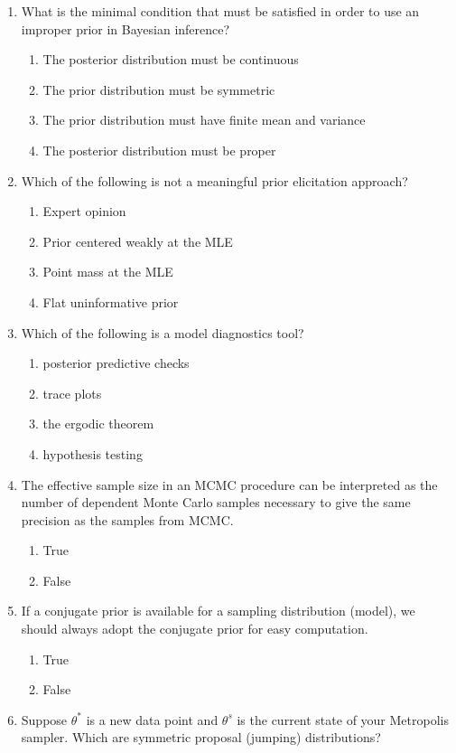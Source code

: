 \documentclass[12pt]{article}
\begin{document}
\begin{enumerate}
\item What is the minimal condition that must be satisfied in order to use an improper prior in Bayesian inference?
\begin{enumerate}
\item The posterior distribution must be continuous
\item  The prior distribution must be symmetric
\item  The prior distribution must have finite mean and variance
\item The posterior distribution must be proper
\end{enumerate}
\item Which of the following is not a meaningful prior elicitation approach?
\begin{enumerate}
\item Expert opinion
\item Prior centered weakly at the MLE
\item Point mass at the MLE
\item Flat uninformative prior
\end{enumerate}
\item Which of the following is a model diagnostics tool?
\begin{enumerate}
\item posterior predictive checks 
\item trace plots
\item the ergodic theorem
\item hypothesis testing
\end{enumerate}
\item The effective sample size in an MCMC procedure can be interpreted as the number of dependent Monte Carlo samples necessary to give the same precision as the samples from MCMC.
\begin{enumerate}
\item True
\item False 
\end{enumerate}
\item If a conjugate prior is available for a sampling distribution (model), we should always adopt the conjugate prior for easy computation.
\begin{enumerate}
\item True
\item False 
\end{enumerate}
\item Suppose $\theta^*$ is a new data point and $\theta^{s}$ is the current state of your Metropolis sampler. Which are symmetric proposal (jumping) distributions?

\end{enumerate}
\end{document}

